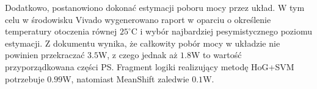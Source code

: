Dodatkowo, postanowiono dokonać estymacji poboru mocy przez układ. W tym celu w środowisku Vivado wygenerowano raport w oparciu o określenie temperatury otoczenia równej $25^{\circ}$C i wybór najbardziej pesymistycznego poziomu estymacji. Z dokumentu wynika, że całkowity pobór mocy w układzie nie powinien przekraczać $3.5$W, z czego jednak aż $1.8$W to wartość przyporządkowana części PS. Fragment logiki realizujący metodę HoG+SVM potrzebuje $0.99$W, natomiast MeanShift zaledwie $0.1$W.